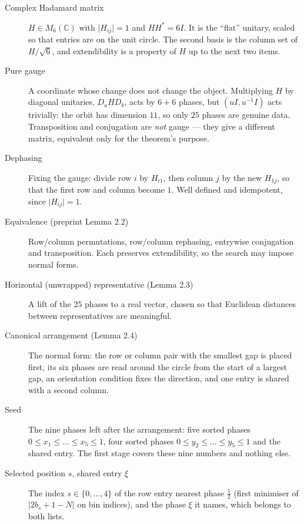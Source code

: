 \documentclass[11pt]{article}
\newcommand{\C}{\mathbb{C}}
\newcommand{\abs}[1]{\lvert #1\rvert}
\newcommand{\grp}[1]{\par\medskip\noindent{\normalsize\bfseries #1}\par\nobreak\vspace{-1pt}}
\begin{document}
\begin{description}
\item[Complex Hadamard matrix] $H\in M_6(\C)$ with $\abs{H_{ij}}=1$ and $HH^*=6I$. It is the
``flat'' unitary, scaled so that entries are on the unit circle. The second basis is the column set of
$H/\sqrt6$, and extendibility is a property of $H$ up to the next two items.
\item[Pure gauge] A coordinate whose change does not change the object. Multiplying $H$ by diagonal
unitaries, $D_aHD_b$, acts by $6+6$ phases, but $(uI,u^{-1}I)$ acts trivially: the orbit has dimension
$11$, so only $25$ phases are genuine data. Transposition and conjugation are \emph{not} gauge --- they
give a different matrix, equivalent only for the theorem's purpose.
\item[Dephasing] Fixing the gauge: divide row $i$ by $H_{i1}$, then column $j$ by the new $H_{1j}$, so
that the first row and column become $1$. Well defined and idempotent, since $\abs{H_{ij}}=1$.
\item[Equivalence (preprint Lemma 2.2)] Row/column permutations, row/column rephasing, entrywise
conjugation and transposition. Each preserves extendibility, so the search may impose normal forms.
\item[Horizontal (unwrapped) representative (Lemma 2.3)] A lift of the $25$ phases to a real vector,
chosen so that Euclidean distances between representatives are meaningful.
\item[Canonical arrangement (Lemma 2.4)] The normal form: the row or column pair with the smallest
gap is placed first, its six phases are read around the circle from the start of a largest gap, an
orientation condition fixes the direction, and one entry is shared with a second column.
\item[Seed] The nine phases left after the arrangement: five sorted phases
$0\le x_1\le\dots\le x_5\le1$, four sorted phases $0\le y_2\le\dots\le y_5\le1$ and the shared entry.
The first stage covers these nine numbers and nothing else.
\item[Selected position $s$, shared entry $\xi$] The index $s\in\{0,\dots,4\}$ of the row entry nearest
phase $\tfrac12$ (first minimiser of $\abs{2b_s+1-N}$ on bin indices), and the phase $\xi$ it names,
which belongs to both lists.
\end{description}

\grp{3.\ Making the search finite}
\end{document}
